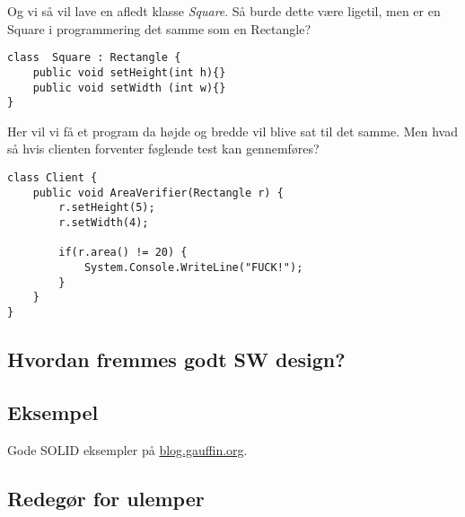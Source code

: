 Og vi så vil lave en afledt klasse \textit{Square}. Så burde dette være ligetil, men er en Square i programmering det samme som en Rectangle?

\begin{lstlisting}
class  Square : Rectangle {
	public void setHeight(int h){}
	public void setWidth (int w){}
}
\end{lstlisting}

Her vil vi få et program da højde og bredde vil blive sat til det samme. Men hvad så hvis clienten forventer føglende test kan gennemføres?

\begin{lstlisting}
class Client {
	public void AreaVerifier(Rectangle r) {
		r.setHeight(5);
		r.setWidth(4);
		
		if(r.area() != 20) {
			System.Console.WriteLine("FUCK!");
		}
	}
}
\end{lstlisting}



\subsection{Hvordan fremmes godt SW design?}
\subsection{Eksempel}
Gode SOLID eksempler på \href{http://blog.gauffin.org/2012/05/11/solid-principles-with-real-world-examples/}{blog.gauffin.org}.

\subsection{Redegør for ulemper}
